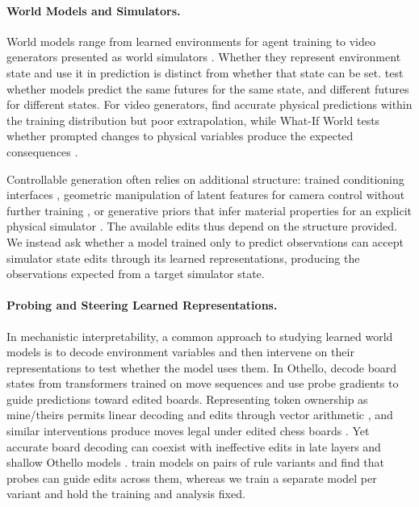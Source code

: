 \documentclass{article} %
\begin{document}
\paragraph{World Models and Simulators.}
World models range from learned environments for agent training \citep{ha2018worldmodels} to video generators presented as world simulators \citep{brooks2024sora,bruce2024genie,nvidia2025cosmos}. Whether they represent environment state and use it in prediction \citep{li2025definition} is distinct from whether that state can be set. \citet{vafa2024evaluating} test whether models predict the same futures for the same state, and different futures for different states. For video generators, \citet{kang2025physical} find accurate physical predictions within the training distribution but poor extrapolation, while What-If World tests whether prompted changes to physical variables produce the expected consequences \citep{cai2026whatif}.

Controllable generation often relies on additional structure: trained conditioning interfaces \citep{zhang2023controlnet,wang2024motionctrl,nvidia2025transfer}, geometric manipulation of latent features for camera control without further training \citep{hou2026camera}, or generative priors that infer material properties for an explicit physical simulator \citep{zhang2024physdreamer}. The available edits thus depend on the structure provided. We instead ask whether a model trained only to predict observations can accept simulator state edits through its learned representations, producing the observations expected from a target simulator state.

\paragraph{Probing and Steering Learned Representations.}
In mechanistic interpretability, a common approach to studying learned world models is to decode environment variables and then intervene on their representations to test whether the model uses them. In Othello, \citet{li2023othello} decode board states from transformers trained on move sequences and use probe gradients to guide predictions toward edited boards. Representing token ownership as mine/theirs permits linear decoding and edits through vector arithmetic \citep{nanda2023linear}, and similar interventions produce moves legal under edited chess boards \citep{karvonen2024chess}. Yet accurate board decoding can coexist with ineffective edits in late layers and shallow Othello models \citep{hazineh2023linear}. \citet{chawla2026metaothello} train models on pairs of rule variants and find that probes can guide edits across them, whereas we train a separate model per variant and hold the training and analysis fixed.
\end{document}
